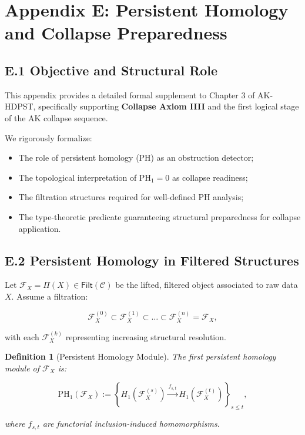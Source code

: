 \documentclass[11pt]{article}
\newtheorem{definition}[theorem]{Definition}
\begin{document}
\section*{Appendix E: Persistent Homology and Collapse Preparedness}

\subsection*{E.1 Objective and Structural Role}

This appendix provides a detailed formal supplement to Chapter 3 of AK-HDPST, specifically supporting \textbf{Collapse Axiom IIII} and the first logical stage of the AK collapse sequence.

We rigorously formalize:

\begin{itemize}
    \item The role of persistent homology (PH) as an obstruction detector;
    \item The topological interpretation of \( \mathrm{PH}_1 = 0 \) as collapse readiness;
    \item The filtration structures required for well-defined PH analysis;
    \item The type-theoretic predicate guaranteeing structural preparedness for collapse application.
\end{itemize}

\subsection*{E.2 Persistent Homology in Filtered Structures}

Let \( \mathcal{F}_X = \Pi(X) \in \mathsf{Filt}(\mathcal{C}) \) be the lifted, filtered object associated to raw data \( X \). Assume a filtration:

\[
\mathcal{F}_X^{(0)} \subset \mathcal{F}_X^{(1)} \subset \ldots \subset \mathcal{F}_X^{(n)} = \mathcal{F}_X,
\]

with each \( \mathcal{F}_X^{(k)} \) representing increasing structural resolution.

\begin{definition}[Persistent Homology Module]
The first persistent homology module of \( \mathcal{F}_X \) is:

\[
\mathrm{PH}_1(\mathcal{F}_X) := \left\{ H_1\left(\mathcal{F}_X^{(s)}\right) \xrightarrow{f_{s,t}} H_1\left(\mathcal{F}_X^{(t)}\right) \right\}_{s \leq t},
\]

where \( f_{s,t} \) are functorial inclusion-induced homomorphisms.
\end{definition}
\end{document}
